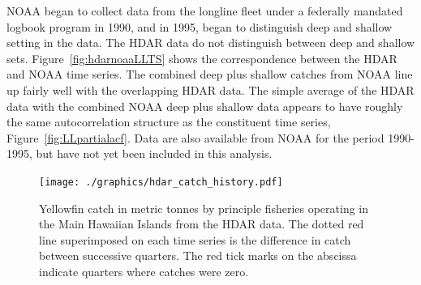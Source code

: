 \documentclass[12pt,letterpaper]{article}
\begin{document}
NOAA began to collect data from the longline fleet under a federally
mandated logbook program in 1990, and in 1995, began to distinguish
deep and shallow setting in the data. The HDAR data do not
distinguish between deep and shallow sets.
Figure~\ref{fig:hdarnoaaLLTS} shows the correspondence between the
HDAR and NOAA time series. The combined deep plus shallow catches from
NOAA line up fairly well with the overlapping HDAR data. The simple
average of the HDAR data with the combined NOAA deep plus shallow data
appears to have roughly the same autocorrelation structure as the
constituent time series, Figure~\ref{fig:LLpartialacf}.
Data are also available from NOAA for the period 1990-1995, but
have not yet been included in this analysis.


\begin{figure}
\begin{center}
\texttt{[image: ./graphics/hdar\_catch\_history.pdf]}
\caption{\label{fig:hdarTS}
Yellowfin catch in metric tonnes by principle fisheries operating in
the Main Hawaiian Islands from the HDAR data.
The dotted red line superimposed on each time series is the difference in
catch between successive quarters.
The red tick marks on the abscissa indicate quarters where catches
were zero.
}
\end{center}
\end{figure}
\end{document}
